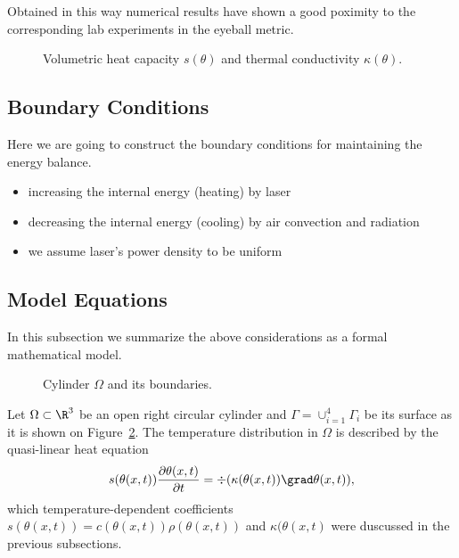 {\color{TolHighContrastBlue}
Obtained in this way numerical results have shown a good poximity to the corresponding lab experiments in the eyeball metric.
}

\begin{figure}[ht]
	\centering
	
	
	\caption{Volumetric heat capacity $s(\theta)$ and thermal conductivity $\kappa(\theta)$.}
	\label{fig:coef}
\end{figure}



\subsection{Boundary Conditions}

Here we are going to construct the boundary conditions for maintaining the energy balance.

\begin{itemize}
	\item increasing the internal energy (heating) by laser
	\item decreasing the internal energy (cooling) by air convection and radiation
	\item we assume laser's power density to be uniform
\end{itemize}

\subsection{Model Equations}
\label{subsec:equations}

In this subsection we summarize the above considerations as a formal mathematical model.

\begin{figure}[ht]
	\centering
	
	\caption{Cylinder $\Omega$ and its boundaries.}
	\label{fig:cylinder}
\end{figure}

Let $\Omega	\subset \R^3$ be an open right circular cylinder and $\Gamma = \cup_{i=1}^4 \Gamma_i$ be its surface as it is shown on Figure~\ref{fig:cylinder}. The temperature distribution in $\Omega$ is described by the quasi-linear heat equation
\begin{equation} \label{eq:heat_eq}
	s(\theta(x,t)) \frac{\partial \theta(x,t)}{\partial t} = \div (\kappa(\theta(x,t)) \grad\theta(x,t)),
\end{equation}
which temperature-dependent coefficients $s(\theta(x,t)) = c(\theta(x,t)) \rho(\theta(x,t))$ and $\kappa(\theta(x,t)$ were duscussed in the previous subsections.

